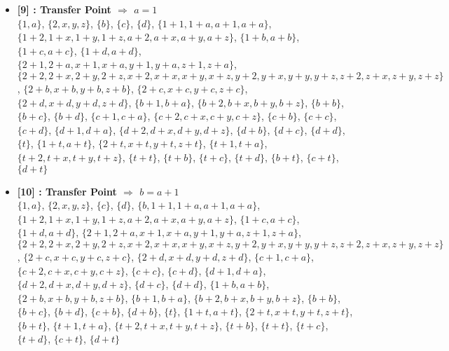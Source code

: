 \begin{itemize}
    \item \textbf{[9] : Transfer Point $\Rightarrow$ $a = 1$}\\
        $\{1, a\}$, $\{2, x, y, z\}$, $\{b\}$, $\{c\}$, $\{d\}$, $\{1 + 1, 1 + a, a + 1, a + a\}$, $\{1 + 2, 1 + x, 1 + y, 1 + z, a + 2, a + x, a + y, a + z\}$, $\{1 + b, a + b\}$, $\{1 + c, a + c\}$, $\{1 + d, a + d\}$, $\{2 + 1, 2 + a, x + 1, x + a, y + 1, y + a, z + 1, z + a\}$, $\{2 + 2, 2 + x, 2 + y, 2 + z, x + 2, x + x, x + y, x + z, y + 2, y + x, y + y, y + z, z + 2, z + x, z + y, z + z\}$, $\{2 + b, x + b, y + b, z + b\}$, $\{2 + c, x + c, y + c, z + c\}$, $\{2 + d, x + d, y + d, z + d\}$, $\{b + 1, b + a\}$, $\{b + 2, b + x, b + y, b + z\}$, $\{b + b\}$, $\{b + c\}$, $\{b + d\}$, $\{c + 1, c + a\}$, $\{c + 2, c + x, c + y, c + z\}$, $\{c + b\}$, $\{c + c\}$, $\{c + d\}$, $\{d + 1, d + a\}$, $\{d + 2, d + x, d + y, d + z\}$, $\{d + b\}$, $\{d + c\}$, $\{d + d\}$, $\{t\}$, $\{1 + t, a + t\}$, $\{2 + t, x + t, y + t, z + t\}$, $\{t + 1, t + a\}$, $\{t + 2, t + x, t + y, t + z\}$, $\{t + t\}$, $\{t + b\}$, $\{t + c\}$, $\{t + d\}$, $\{b + t\}$, $\{c + t\}$, $\{d + t\}$

    \item \textbf{[10] : Transfer Point $\Rightarrow$ $b = a + 1$}\\
        $\{1, a\}$, $\{2, x, y, z\}$, $\{c\}$, $\{d\}$, $\{b, 1 + 1, 1 + a, a + 1, a + a\}$, $\{1 + 2, 1 + x, 1 + y, 1 + z, a + 2, a + x, a + y, a + z\}$, $\{1 + c, a + c\}$, $\{1 + d, a + d\}$, $\{2 + 1, 2 + a, x + 1, x + a, y + 1, y + a, z + 1, z + a\}$, $\{2 + 2, 2 + x, 2 + y, 2 + z, x + 2, x + x, x + y, x + z, y + 2, y + x, y + y, y + z, z + 2, z + x, z + y, z + z\}$, $\{2 + c, x + c, y + c, z + c\}$, $\{2 + d, x + d, y + d, z + d\}$, $\{c + 1, c + a\}$, $\{c + 2, c + x, c + y, c + z\}$, $\{c + c\}$, $\{c + d\}$, $\{d + 1, d + a\}$, $\{d + 2, d + x, d + y, d + z\}$, $\{d + c\}$, $\{d + d\}$, $\{1 + b, a + b\}$, $\{2 + b, x + b, y + b, z + b\}$, $\{b + 1, b + a\}$, $\{b + 2, b + x, b + y, b + z\}$, $\{b + b\}$, $\{b + c\}$, $\{b + d\}$, $\{c + b\}$, $\{d + b\}$, $\{t\}$, $\{1 + t, a + t\}$, $\{2 + t, x + t, y + t, z + t\}$, $\{b + t\}$, $\{t + 1, t + a\}$, $\{t + 2, t + x, t + y, t + z\}$, $\{t + b\}$, $\{t + t\}$, $\{t + c\}$, $\{t + d\}$, $\{c + t\}$, $\{d + t\}$


\end{itemize}
